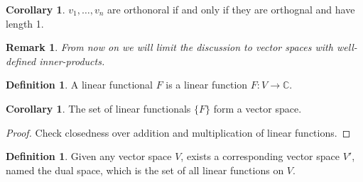 \documentclass[12pt]{article}
\def\C{{\mathbb{C}}}
\numberwithin{theorem}{section}
\newtheorem{remark}[theorem]{Remark}
\theoremstyle{definition}
\newtheorem{definition}[theorem]{Definition}
\newtheorem{corollary}[theorem]{Corollary}
\begin{document}
\begin{corollary}
    $v_1, \dots, v_n$ are orthonoral if and only if they are orthognal and have length 1.
\end{corollary}

\begin{remark}
    From now on we will limit the discussion to vector spaces with well-defined inner-products.
\end{remark}

\begin{definition}
    A linear functional $F$ is a linear function $F:V\to\C$.
\end{definition}

\begin{corollary}
    The set of linear functionals $\{F\}$ form a vector space.
\end{corollary}

\begin{proof}
    Check closedness over addition and multiplication of linear functions.
\end{proof}

\begin{definition}
    Given any vector space $V$, exists a corresponding vector space $V'$, named the dual space, which is the set of all linear functions on $V$.
\end{definition}
\end{document}
